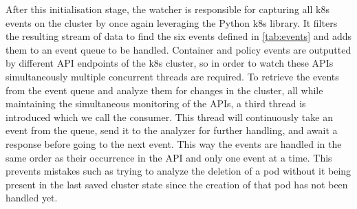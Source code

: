 After this initialisation stage, the watcher is responsible for capturing all \acrshort{k8s} events on the cluster by once again leveraging the Python \acrshort{k8s} library. It filters the resulting stream of data to find the six events defined in \autoref{tab:events} and adds them to an event queue to be handled. Container and policy events are outputted by different API endpoints of the \acrshort{k8s} cluster, so in order to watch these APIs simultaneously multiple concurrent threads are required. To retrieve the events from the event queue and analyze them for changes in the cluster, all while maintaining the simultaneous monitoring of the APIs, a third thread is introduced which we call the consumer. This thread will continuously take an event from the queue, send it to the analyzer for further handling, and await a response before going to the next event. This way the events are handled in the same order as their occurrence in the API and only one event at a time. This prevents mistakes such as trying to analyze the deletion of a pod without it being present in the last saved cluster state since the creation of that pod has not been handled yet. 
\\[10pt]
